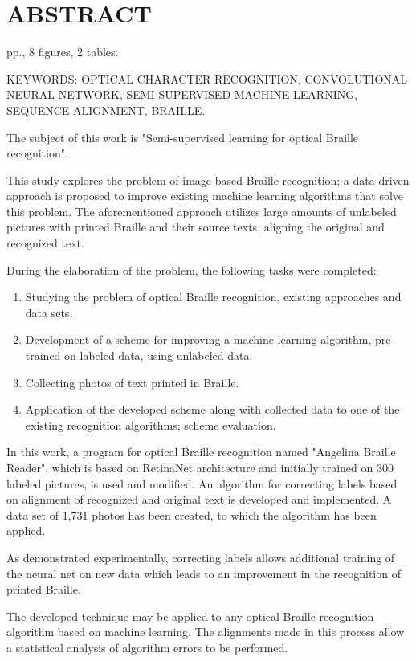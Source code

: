 \documentclass{main.tex}[subfiles]
\begin{document}
\newpage
\thispagestyle{empty}
\section*{ABSTRACT}

\pageref*{LastPage} pp., 8 figures, 2 tables.

KEYWORDS: OPTICAL CHARACTER RECOGNITION, CONVOLUTIONAL\\
\noindent NEU\-RAL NETWORK, SEMI-SUPERVISED MACHINE LEARNING, SE\-QUENCE ALIGN\-MENT, BRAILLE.

The subject of this work is "Semi-supervised learning for optical Braille recog\-ni\-ti\-on".

This study explores the problem of image-based Braille recognition; a data-driven approach is proposed to improve existing machine learning algorithms that solve this problem.
The aforementioned approach utilizes large amounts of unlabeled pictures with printed Braille and their source texts, aligning the original and recognized text.

During the elaboration of the problem, the following tasks were completed:
\begin{enumerate}[noitemsep]
    \item Studying the problem of optical Braille recognition, existing approaches and data sets.
    \item Development of a scheme for improving a machine learning algorithm, pre-trained on labeled data, using unlabeled data.
    \item Collecting photos of text printed in Braille.
    \item Application of the developed scheme along with collected data to one of the existing recognition algorithms; scheme evaluation.
\end{enumerate}

In this work, a program for optical Braille recognition named "Angelina Braille Reader"\hspace{0pt}, which is based on Retina\-Net architecture and initially trained on 300 labeled pictures, is used and modified.
An algorithm for correcting labels based on alignment of recognized and original text is developed and implemented.
A data set of 1,731 photos has been created, to which the algorithm has been applied.

As demonstrated experimentally, correcting labels allows additional training of the neural net on new data which leads to an improvement in the recognition of printed Braille.

The developed technique may be applied to any optical Braille recognition algorithm based on machine learning.
The alignments made in this process allow a statistical analysis of algorithm errors to be performed.

\newpage
\end{document}
